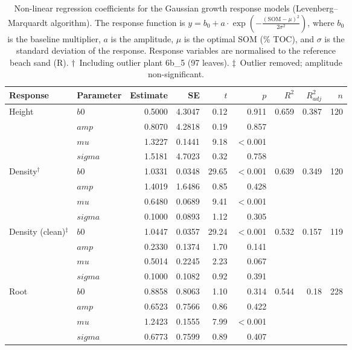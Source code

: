 \begin{table}[htbp]
\centering
\caption{Non-linear regression coefficients for the Gaussian growth response models (Levenberg--Marquardt algorithm). The response function is $y = b_0 + a \cdot \exp\left(-\frac{(\mathrm{SOM} - \mu)^2}{2\sigma^2}\right)$, where $b_0$ is the baseline multiplier, $a$ is the amplitude, $\mu$ is the optimal SOM (\% TOC), and $\sigma$ is the standard deviation of the response. Response variables are normalised to the reference beach sand (R). $\dagger$~Including outlier plant 6b\_5 (97 leaves). $\ddagger$~Outlier removed; amplitude non-significant.}
\label{tab:growth_coefficients}
\small
\begin{tabular}{ll rrrr rr r}
\toprule
Response & Parameter & Estimate & SE & $t$ & $p$ & $R^2$ & $R^2_{adj}$ & $n$ \\
\midrule
Height & $b0$ & 0.5000 & 4.3047 & 0.12 & 0.911 & 0.659 & 0.387 & 120 \\
 & $amp$ & 0.8070 & 4.2818 & 0.19 & 0.857 &  &  &  \\
 & $mu$ & 1.3227 & 0.1441 & 9.18 & $<$0.001 &  &  &  \\
 & $sigma$ & 1.5181 & 4.7023 & 0.32 & 0.758 &  &  &  \\
\midrule
Density$^\dagger$ & $b0$ & 1.0331 & 0.0348 & 29.65 & $<$0.001 & 0.639 & 0.349 & 120 \\
 & $amp$ & 1.4019 & 1.6486 & 0.85 & 0.428 &  &  &  \\
 & $mu$ & 0.6480 & 0.0689 & 9.41 & $<$0.001 &  &  &  \\
 & $sigma$ & 0.1000 & 0.0893 & 1.12 & 0.305 &  &  &  \\
\midrule
Density (clean)$^\ddagger$ & $b0$ & 1.0447 & 0.0357 & 29.24 & $<$0.001 & 0.532 & 0.157 & 119 \\
 & $amp$ & 0.2330 & 0.1374 & 1.70 & 0.141 &  &  &  \\
 & $mu$ & 0.5014 & 0.2245 & 2.23 & 0.067 &  &  &  \\
 & $sigma$ & 0.1000 & 0.1082 & 0.92 & 0.391 &  &  &  \\
\midrule
Root & $b0$ & 0.8858 & 0.8063 & 1.10 & 0.314 & 0.544 & 0.18 & 228 \\
 & $amp$ & 0.6523 & 0.7566 & 0.86 & 0.422 &  &  &  \\
 & $mu$ & 1.2423 & 0.1555 & 7.99 & $<$0.001 &  &  &  \\
 & $sigma$ & 0.6773 & 0.7599 & 0.89 & 0.407 &  &  &  \\
\bottomrule
\end{tabular}
\end{table}
